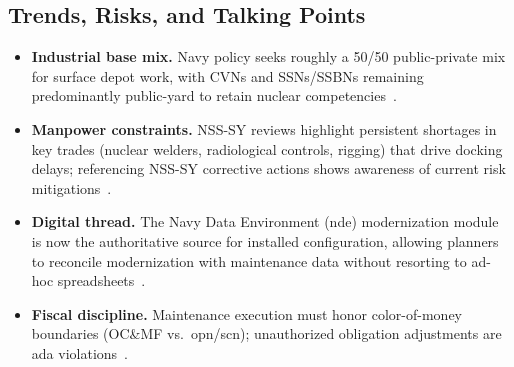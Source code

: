 \documentclass[../main.tex]{subfiles}
\begin{document}
\subsection{Trends, Risks, and Talking Points}
\begin{itemize}
\item \textbf{Industrial base mix.} Navy policy seeks roughly a 50/50 public-private mix for surface depot work, with CVNs and SSNs/SSBNs remaining predominantly public-yard to retain nuclear competencies~\autocite{OPNAVINST4700-7M}.
\item \textbf{Manpower constraints.} NSS-SY reviews highlight persistent shortages in key trades (nuclear welders, radiological controls, rigging) that drive docking delays; referencing NSS-SY corrective actions shows awareness of current risk mitigations~\autocite{edo-4-1-3-fleet-maint-policy-2025}.
\item \textbf{Digital thread.} The Navy Data Environment (\ac{nde}) modernization module is now the authoritative source for installed configuration, allowing planners to reconcile modernization with maintenance data without resorting to ad-hoc spreadsheets~\autocite{TS9090-310}.
\item \textbf{Fiscal discipline.} Maintenance execution must honor color-of-money boundaries (OC\&MF vs.\ \ac{opn}/\ac{scn}); unauthorized obligation adjustments are \ac{ada} violations~\autocite{DoDFMR-Vol3,FAR}.
\end{itemize}

\end{document}
